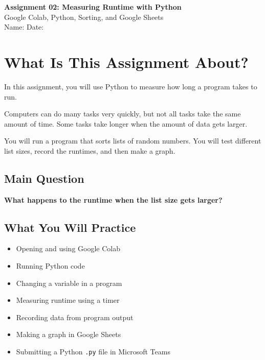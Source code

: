 \documentclass[11pt]{article}
\begin{document}
\begin{center}
    {\Large \textbf{Assignment 02: Measuring Runtime with Python}}\\[6pt]
    {\large Google Colab, Python, Sorting, and Google Sheets}\\[12pt]
    Name: \underline{\hspace{2.5in}} \hfill Date: \underline{\hspace{1.5in}}
\end{center}

\vspace{0.15in}

\section*{What Is This Assignment About?}

In this assignment, you will use Python to measure how long a program takes to run.

Computers can do many tasks very quickly, but not all tasks take the same amount of time. Some tasks take longer when the amount of data gets larger.

You will run a program that sorts lists of random numbers. You will test different list sizes, record the runtimes, and then make a graph.

\subsection*{Main Question}

\begin{center}
\textbf{What happens to the runtime when the list size gets larger?}
\end{center}

\subsection*{What You Will Practice}

\begin{itemize}
    \item Opening and using Google Colab
    \item Running Python code
    \item Changing a variable in a program
    \item Measuring runtime using a timer
    \item Recording data from program output
    \item Making a graph in Google Sheets
    \item Submitting a Python \texttt{.py} file in Microsoft Teams
\end{itemize}
\end{document}
